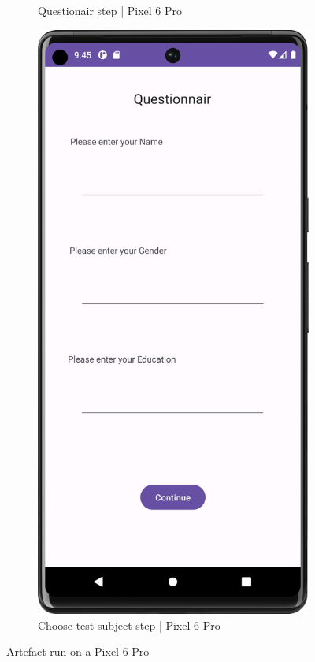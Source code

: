 \begin{figure}[htbp]
\begin{subfigure}[b]{0.25\textwidth}
        \caption{ Questionair step | Pixel 6 Pro}
        \label{subfig:QuestionairPixel}
    \end{subfigure}
        \hspace{1cm}
    \begin{subfigure}[b]{0.25\textwidth}
        \centering
        \includegraphics[width=\textwidth]{content/07_evaluation_of_the_solution/Screenshot_T10c.png}
        \caption{Choose test subject step | Pixel 6 Pro}
        \label{subfig:chooseTestSubjectPixel}
    \end{subfigure}
       \caption{Artefact run on a Pixel 6 Pro}
       \label{fig:uiScreensPixel6}
\end{figure}

